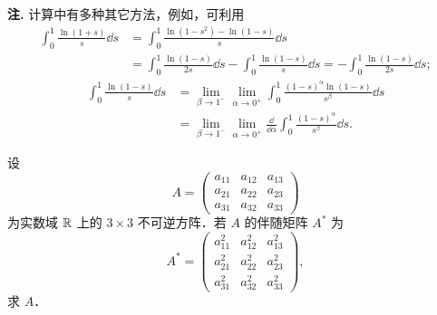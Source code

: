 \begin{solution}
\textbf{注.} 计算中有多种其它方法，例如，可利用
\begin{align*}
  \int_0^1\frac{\ln(1+s)}{s}\dd s&=\int_0^1\frac{\ln(1-s^2)-\ln(1-s)}{s}\dd s\\
  &=\int_0^1\frac{\ln(1-s)}{2s}\dd s-\int_0^1\frac{\ln(1-s)}{s}\dd s
   =-\int_0^1\frac{\ln(1-s)}{2s}\dd s;
\end{align*}
\begin{align*}
  \int_0^1\frac{\ln(1-s)}{s}\dd s
  &=\lim_{\beta\to 1^-}\lim_{\alpha\to 0^+}\int_0^1\frac{(1-s)^\alpha\ln(1-s)}{s^\beta}\dd s\\
  &=\lim_{\beta\to 1^-}\lim_{\alpha\to 0^+}\frac{\dd}{\dd\alpha}\int_0^1\frac{(1-s)^\alpha}{s^\beta}\dd s.
\end{align*}
\end{solution}

设
\[
  A=\begin{pmatrix}
    a_{11} & a_{12} & a_{13}\\
    a_{21} & a_{22} & a_{23}\\
    a_{31} & a_{32} & a_{33}
  \end{pmatrix}
\]
为实数域 $\mathbb{R}$ 上的 $3\times 3$ 不可逆方阵．若 $A$ 的伴随矩阵 $A^*$ 为
\[
  A^*=\begin{pmatrix}
    a_{11}^2 & a_{12}^2 & a_{13}^2\\
    a_{21}^2 & a_{22}^2 & a_{23}^2\\
    a_{31}^2 & a_{32}^2 & a_{33}^2
  \end{pmatrix},
\]
求 $A$．

